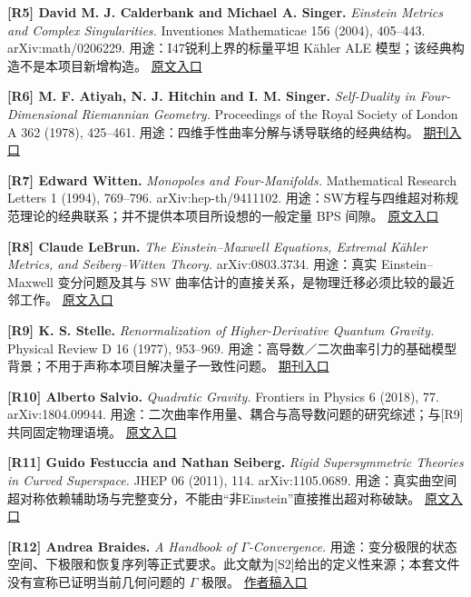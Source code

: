 \documentclass[UTF8,a4paper,11pt,fontset=fandol]{ctexart}
\begin{document}
\textbf{{[}R5{]} David M. J. Calderbank and Michael A. Singer.}
\emph{Einstein Metrics and Complex Singularities.} Inventiones
Mathematicae 156 (2004), 405--443. arXiv:math/0206229.
用途：I47锐利上界的标量平坦 Kähler ALE
模型；该经典构造不是本项目新增构造。
\href{https://arxiv.org/abs/math/0206229}{原文入口}

\textbf{{[}R6{]} M. F. Atiyah, N. J. Hitchin and I. M. Singer.}
\emph{Self-Duality in Four-Dimensional Riemannian Geometry.} Proceedings
of the Royal Society of London A 362 (1978), 425--461.
用途：四维手性曲率分解与诱导联络的经典结构。
\href{https://royalsocietypublishing.org/rspa/article/362/1711/425/14679/Self-duality-in-four-dimensional-Riemannian}{期刊入口}

\textbf{{[}R7{]} Edward Witten.} \emph{Monopoles and Four-Manifolds.}
Mathematical Research Letters 1 (1994), 769--796. arXiv:hep-th/9411102.
用途：SW方程与四维超对称规范理论的经典联系；并不提供本项目所设想的一般定量
BPS 间隙。 \href{https://arxiv.org/abs/hep-th/9411102}{原文入口}

\textbf{{[}R8{]} Claude LeBrun.} \emph{The Einstein--Maxwell Equations,
Extremal Kähler Metrics, and Seiberg--Witten Theory.} arXiv:0803.3734.
用途：真实 Einstein--Maxwell 变分问题及其与 SW
曲率估计的直接关系，是物理迁移必须比较的最近邻工作。
\href{https://arxiv.org/abs/0803.3734}{原文入口}

\textbf{{[}R9{]} K. S. Stelle.} \emph{Renormalization of
Higher-Derivative Quantum Gravity.} Physical Review D 16 (1977),
953--969.
用途：高导数／二次曲率引力的基础模型背景；不用于声称本项目解决量子一致性问题。
\href{https://doi.org/10.1103/PhysRevD.16.953}{期刊入口}

\textbf{{[}R10{]} Alberto Salvio.} \emph{Quadratic Gravity.} Frontiers
in Physics 6 (2018), 77. arXiv:1804.09944.
用途：二次曲率作用量、耦合与高导数问题的研究综述；与{[}R9{]}共同固定物理语境。
\href{https://arxiv.org/abs/1804.09944}{原文入口}

\textbf{{[}R11{]} Guido Festuccia and Nathan Seiberg.} \emph{Rigid
Supersymmetric Theories in Curved Superspace.} JHEP 06 (2011), 114.
arXiv:1105.0689.
用途：真实曲空间超对称依赖辅助场与完整变分，不能由``非Einstein''直接推出超对称破缺。
\href{https://arxiv.org/abs/1105.0689}{原文入口}

\textbf{{[}R12{]} Andrea Braides.} \emph{A Handbook of
\(\Gamma\)-Convergence.}
用途：变分极限的状态空间、下极限和恢复序列等正式要求。此文献为{[}S2{]}给出的定义性来源；本套文件没有宣称已证明当前几何问题的
\(\Gamma\) 极限。
\href{https://cvgmt.sns.it/media/doc/paper/57/Handbook.pdf}{作者稿入口}
\end{document}
